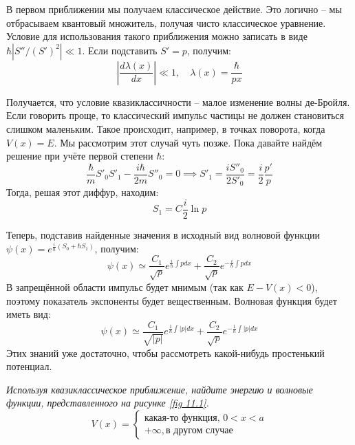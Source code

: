 В первом приближении мы получаем классическое действие. Это логично -- мы отбрасываем квантовый множитель, получая чисто классическое уравнение. Условие для использования такого приближения можно записать в виде $\hbar|S''/(S')^2| \ll 1$. Если подставить $S' = p$, получим:
\[
\left|\frac{d\lambda(x)}{dx}\right| \ll 1, \quad \lambda(x) = \frac{\hbar}{px}
\]

Получается, что условие квазиклассичности -- малое изменение волны де-Бройля. Если говорить проще, то классический импульс частицы не должен становиться слишком маленьким. Такое происходит, например, в точках поворота, когда $V(x) = E$. Мы рассмотрим этот случай чуть позже. Пока давайте найдём решение при учёте первой степени $\hbar$:
\[
\frac{\hbar}{m}S'_0 S'_1 - \frac{i\hbar}{2m}S''_0 = 0 \implies S'_1 = \frac{iS''_0}{2S'_0} = \frac{i}{2}\frac{p'}{p}
\]
Тогда, решая этот диффур, находим:
\[
S_1 = C\frac{i}{2}\ln p
\]

Теперь, подставив найденные значения в исходный вид волновой функции $\psi(x) = e^{\frac{i}{\hbar}(S_0 + \hbar S_1)}$, получим:
\[
\psi(x) \simeq \frac{C_1}{\sqrt{p}}e^{\frac{i}{\hbar}\int p dx} + \frac{C_2}{\sqrt{p}}e^{-\frac{i}{\hbar}\int p dx}
\]
В запрещённой области импульс будет мнимым (так как $E - V(x) < 0$), поэтому показатель экспоненты будет вещественным. Волновая функция будет иметь вид:
\[
\psi(x) \simeq \frac{C_1}{\sqrt{|p|}}e^{\frac{1}{\hbar}\int |p| dx} + \frac{C_2}{\sqrt{p}}e^{-\frac{1}{\hbar}\int |p| dx}
\]
Этих знаний уже достаточно, чтобы рассмотреть какой-нибудь простенький потенциал.
\begin{center}
    \textit{Используя квазиклассическое приближение, найдите энергию и волновые функции, представленного на рисунке \ref{fig 11.1}.}
    \[
    V(x) = 
    \begin{cases}
    \text{какая-то функция, } 0<x<a\\
    +\infty, \text{в другом случае}
    \end{cases}
    \]
\end{center}

